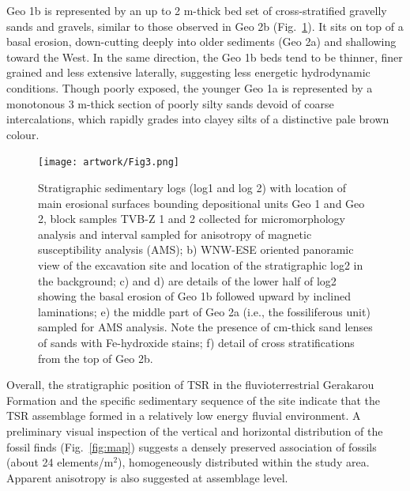 \documentclass[review,times,authoryear]{elsarticle} %
\begin{document}
Geo 1b is represented by an up to 2 m-thick bed set of cross-stratified gravelly sands and gravels, similar to those observed in Geo 2b (Fig.~\ref{fig:log}). It sits on top of a basal erosion, down-cutting deeply into older sediments (Geo 2a) and shallowing toward the West. In the same direction, the Geo 1b beds tend to be thinner, finer grained and less extensive laterally, suggesting less energetic hydrodynamic conditions. Though poorly exposed, the younger Geo 1a is represented by a monotonous 3 m-thick section of poorly silty sands devoid of coarse intercalations, which rapidly grades into clayey silts of a distinctive pale brown colour.

\begin{figure}
  \centering
  \texttt{[image: artwork/Fig3.png]}
  \caption{Stratigraphic sedimentary logs (log1 and log 2) with location of main erosional surfaces bounding depositional units Geo 1 and Geo 2, block samples TVB-Z 1 and 2 collected for micromorphology analysis and interval sampled for anisotropy of magnetic susceptibility analysis (AMS); b) WNW-ESE oriented panoramic view of the excavation site and location of the stratigraphic log2 in the background; c) and d) are details of the lower half of log2 showing the basal erosion of Geo 1b followed upward by inclined laminations; e) the middle part of Geo 2a (i.e., the fossiliferous unit) sampled for AMS analysis. Note the presence of cm-thick sand lenses of sands with Fe-hydroxide stains; f) detail of cross stratifications from the top of Geo 2b.}
  \label{fig:log}
\end{figure}

Overall, the stratigraphic position of TSR in the fluvioterrestrial Gerakarou Formation \citep{Koufos1995} and the specific sedimentary sequence of the site indicate that the TSR assemblage formed in a relatively low energy fluvial environment. A preliminary visual inspection of the vertical and horizontal distribution of the fossil finds (Fig.~\ref{fig:map}) suggests a densely preserved association of fossils (about 24 elements/m$^2$), homogeneously distributed within the study area. Apparent anisotropy is also suggested at assemblage level.
\end{document}
